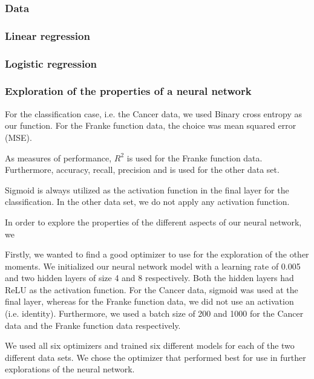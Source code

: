 \subsubsection{Data}

\subsubsection{Linear regression}

\subsubsection{Logistic regression}

\subsubsection{Exploration of the properties of a neural network}

For the classification case, i.e. the Cancer data, we used Binary cross entropy as our  function. For the Franke function data, the choice was mean squared error (MSE). 

As measures of performance, $R^2$ is used for the Franke function data. 
Furthermore, accuracy, recall, precision and  is used for the other data set. 

Sigmoid is always utilized as the activation function in the final layer for the classification. 
In the other data set, we do not apply any activation function. 


In order to explore the properties of the different aspects of our neural network, we 

Firstly, we wanted to find a good optimizer to use for the exploration of the other moments. 
We initialized our neural network model with a learning rate of 0.005 and two hidden layers of size 4 and 8 respectively. 
Both the hidden layers had ReLU as the activation function. 
For the Cancer data, sigmoid was used at the final layer, whereas for the Franke function data, we did not use an activation (i.e. identity). 
Furthermore, we used a batch size of 200 and 1000 for the Cancer data and the Franke function data respectively. 

We used all six optimizers and trained six different models for each of the two different data sets. 
We chose the optimizer that performed best for use in further explorations of the neural network. 


